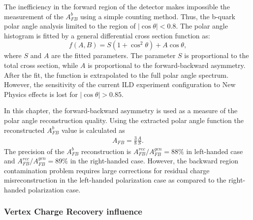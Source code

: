 The  inefficiency in the forward region of the detector makes impossible the measurement of the $A_{FB}^b$ using a simple counting method. 
Thus, the b-quark polar angle analysis limited to the region of $|\cos\theta| < 0.8$.
The polar angle histogram is fitted by a general differential cross section function as:
\begin{equation}
	f(A,B) = S(1+\cos^2\theta) + A \cos\theta, %
	\label{formula:PolarAngleFit_3}
\end{equation}
where $S$ and $A$ are the fitted parameters. 
The parameter $S$ is proportional to the total cross section, while $A$ is proportional to the forward-backward asymmetry.
After the fit, the function is extrapolated to the full polar angle spectrum.
However, the sensitivity of the current ILD experiment configuration to New Physics effects is lost for $|\cos\theta| > 0.85$.

In this chapter, the forward-backward asymmetry is used as a measure of the polar angle reconstruction quality.
Using the extracted polar angle function the reconstructed $A_{FB}^b$ value is calculated as
\begin{eqnarray}
	A_{FB} = \frac{3}{8}\frac{A}{S}.
\end{eqnarray} 
The precision of the $A_{FB}^b$ reconstruction is $A_{FB}^{rec}/A^{gen}_{FB} = 88\%$ in left-handed case and  $A_{FB}^{rec}/A^{gen}_{FB} = 89\%$ in the right-handed case.  
However, the backward region contamination problem requires large corrections for residual charge misreconstruction in the left-handed polarization case as compared to the right-handed polarization case. 


\subsubsection{Vertex Charge Recovery influence}

